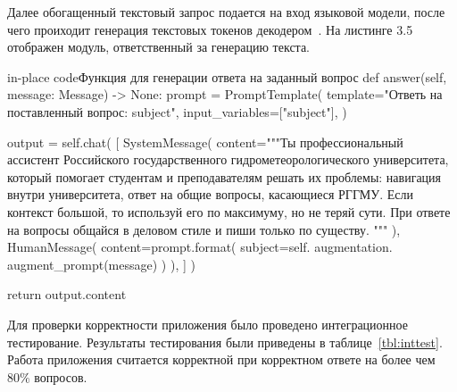 Далее обогащенный текстовый запрос подается на вход языковой модели, после чего
проиходит генерация текстовых токенов декодером~\cite{a}. На листинге 3.5
отображен модуль, ответственный за генерацию текста.

\begin{codepiece}{in-place code}{Функция для генерации ответа на заданный вопрос}
        def answer(self, message: Message) -> None:
            prompt = PromptTemplate(
                template="Ответь на поставленный вопрос: {subject}",
                input_variables=["subject"],
            )
    
            output = self.chat(
                [
                    SystemMessage(
                        content="""Ты профессиональный ассистент Российского
                        государственного гидрометеорологического университета,
                        который помогает студентам и преподавателям решать их
                        проблемы: навигация внутри университета, ответ на общие
                        вопросы, касающиеся РГГМУ. Если контекст большой, то
                        используй его по максимуму, но не теряй сути.
                        При ответе на вопросы общайся в деловом стиле и пиши
                        только по существу. """
                    ),
                    HumanMessage(
                        content=prompt.format(
                            subject=self.
                            augmentation.
                            augment_prompt(message)
                        )
                    ),
                ]
            )
  

            return output.content
\end{codepiece}


Для проверки корректности приложения было проведено интеграционное
тестирование. Результаты тестирования были приведены в таблице~\ref{tbl:inttest}.
Работа приложения считается корректной при корректном ответе на более чем
$80\%$ вопросов.

